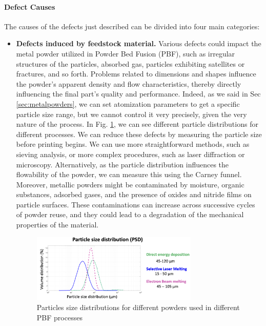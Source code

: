 \paragraph{Defect Causes} The causes of the defects just described can be divided into four main categories:
\begin{itemize}
    \item \textbf{Defects induced by feedstock material.} Various defects could impact the metal powder utilized in Powder Bed Fusion (PBF), such as irregular structures of the particles, absorbed gas, particles exhibiting satellites or fractures, and so forth. Problems related to dimensions and shapes influence the powder's apparent density and flow characteristics, thereby directly influencing the final part's quality and performance. Indeed, as we said in Sec \ref{sec:metalpowders}, we can set atomization parameters to get a specific particle size range, but we cannot control it very precisely, given the very nature of the process. In Fig. \ref{fig:particlesdistributions}, we can see different particle distributions for different processes. We can reduce these defects by measuring the particle size before printing begins. We can use more straightforward methods, such as sieving analysis, or more complex procedures, such as laser diffraction or microscopy. Alternatively, as the particle distribution influences the flowability of the powder, we can measure this using the Carney funnel. Moreover, metallic powders might be contaminated by moisture, organic substances, adsorbed gases, and the presence of oxides and nitride films on particle surfaces. These contaminations can increase across successive cycles of powder reuse, and they could lead to a degradation of the mechanical properties of the material.
\begin{figure}
    \centering
    \includegraphics[width=0.75\textwidth]{Images/particlesdistributions.png}
    \caption[Particles distribution.]{Particles size distributions for different powders used in different PBF processes}
    \label{fig:particlesdistributions}
\end{figure}

\end{itemize}
